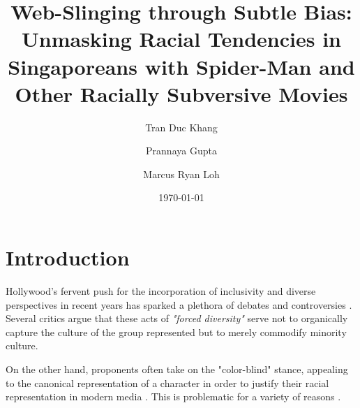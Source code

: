 \documentclass[%
 reprint,
 amsmath,amssymb,
 aps,
]{revtex4-2}
\begin{document}

\title{Web-Slinging through Subtle Bias: Unmasking Racial Tendencies in Singaporeans with Spider-Man and Other Racially Subversive Movies}

\author{Tran Duc Khang}%
\author{Prannaya Gupta}%
\author{Marcus Ryan Loh}%
 
%




\date{\today}%


\maketitle


\section{\label{sec:introduction}Introduction}


Hollywood's fervent push for the incorporation of inclusivity and diverse perspectives in recent years \cite{ramon_film_2021} has sparked a plethora of debates and controversies \cite{fu_fear_2015, romano_racist_2022, howard_spider-man_2016}. Several critics argue that these acts of \emph{"forced diversity"} serve not to organically capture the culture of the group represented but to merely commodify minority culture\cite{gray_performing_2018,great_bury_2023,romano_racist_2022}.

On the other hand, proponents often take on the "color-blind" stance, appealing to the canonical representation of a character in order to justify their racial representation in modern media \cite{fu_fear_2015}. This is problematic for a variety of reasons \cite{bonilla_linguistics_2002,history_segregation_2023, fu_fear_2015}.
\end{document}
